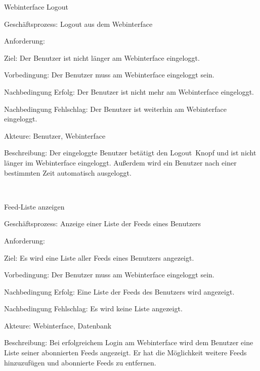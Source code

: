 \begin{function}{61}{Webinterface Logout}
\item[Geschäftsprozess:] Logout aus dem Webinterface
\item[Anforderung:] 
\item[Ziel:] Der Benutzer ist nicht länger am Webinterface eingeloggt.
\item[Vorbedingung:] Der Benutzer muss am Webinterface eingeloggt sein.
\item[Nachbedingung Erfolg:] Der Benutzer ist nicht mehr am Webinterface eingeloggt.
\item[Nachbedingung Fehlschlag:] Der Benutzer ist weiterhin am Webinterface eingeloggt.
\item[Akteure:] Benutzer, Webinterface
\item[Beschreibung:] Der eingeloggte Benutzer betätigt den \glqq Logout\grqq\ Knopf und ist nicht länger im Webinterface eingeloggt. Außerdem wird ein Benutzer nach einer bestimmten Zeit automatisch ausgeloggt.
\end{function} ~

\begin{function}{70}{Feed-Liste anzeigen}
\item[Geschäftsprozess:] Anzeige einer Liste der Feeds eines Benutzers
\item[Anforderung:] 
\item[Ziel:] Es wird eine Liste aller Feeds eines Benutzers angezeigt.
\item[Vorbedingung:] Der Benutzer muss am Webinterface eingeloggt sein.
\item[Nachbedingung Erfolg:] Eine Liste der Feeds des Benutzers wird angezeigt.
\item[Nachbedingung Fehlschlag:] Es wird keine Liste angezeigt.
\item[Akteure:] Webinterface, Datenbank
\item[Beschreibung:] Bei erfolgreichem Login am Webinterface wird dem Benutzer eine Liste seiner abonnierten Feeds angezeigt. Er hat die Möglichkeit weitere Feeds hinzuzufügen und abonnierte Feeds zu entfernen.
\end{function} ~

